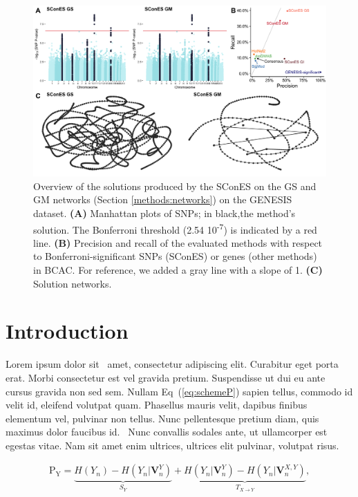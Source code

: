 \documentclass[10pt,letterpaper]{article}
\begin{document}
\begin{figure}[htbp]
  \centering
  \includegraphics[width=\linewidth]{./figures/sfigure_9.png}
  \caption{Overview of the solutions produced by the SConES on the GS and GM networks (Section \ref{methods:networks}) on the GENESIS dataset. \textbf{(A)} Manhattan plots of SNPs; in black,the method’s solution. The Bonferroni threshold (2.54 \texttimes{} 10\textsuperscript{-7}) is indicated by a red line. \textbf{(B)} Precision and recall of the evaluated methods with respect to Bonferroni-significant SNPs (SConES) or genes (other methods) in BCAC. For reference, we added a gray line with a slope of 1. \textbf{(C)} Solution networks.}
  \label{sfig:scones_gsm}
\end{figure}


\section*{Introduction}
Lorem ipsum dolor sit~\cite{bib1} amet, consectetur adipiscing elit. Curabitur eget porta erat. Morbi consectetur est vel gravida pretium. Suspendisse ut dui eu ante cursus gravida non sed sem. Nullam Eq~(\ref{eq:schemeP}) sapien tellus, commodo id velit id, eleifend volutpat quam. Phasellus mauris velit, dapibus finibus elementum vel, pulvinar non tellus. Nunc pellentesque pretium diam, quis maximus dolor faucibus id.~\cite{bib2} Nunc convallis sodales ante, ut ullamcorper est egestas vitae. Nam sit amet enim ultrices, ultrices elit pulvinar, volutpat risus.

\begin{eqnarray}
\label{eq:schemeP}
	\mathrm{P_Y} = \underbrace{H(Y_n) - H(Y_n|\mathbf{V}^{Y}_{n})}_{S_Y} + \underbrace{H(Y_n|\mathbf{V}^{Y}_{n})- H(Y_n|\mathbf{V}^{X,Y}_{n})}_{T_{X\rightarrow Y}},
\end{eqnarray}
\end{document}
